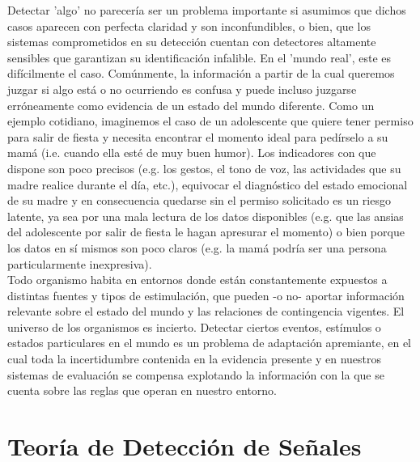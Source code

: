 Detectar 'algo' no parecería ser un problema importante si asumimos que dichos casos aparecen con perfecta claridad y son inconfundibles, o bien, que los sistemas comprometidos en su detección cuentan con detectores altamente sensibles que garantizan su identificación infalible. En el 'mundo real', este es difícilmente el caso. Comúnmente, la información a partir de la cual queremos juzgar si algo está o no ocurriendo es confusa y puede incluso juzgarse erróneamente como evidencia de un estado del mundo diferente. Como un ejemplo cotidiano, imaginemos el caso de un adolescente que quiere tener permiso para salir de fiesta y necesita encontrar el momento ideal para pedírselo a su mamá (i.e. cuando ella esté de muy buen humor). Los indicadores con que dispone son poco precisos (e.g. los gestos, el tono de voz, las actividades que su madre realice durante el día, etc.), equivocar el diagnóstico del estado emocional de su madre y en consecuencia quedarse sin el permiso solicitado es un riesgo latente, ya sea por una mala lectura de los datos disponibles (e.g. que las ansias del adolescente por salir de fiesta le hagan apresurar el momento) o bien porque los datos en sí mismos son poco claros (e.g. la mamá podría ser una persona particularmente inexpresiva).\\ 




Todo organismo habita en entornos donde están constantemente expuestos a distintas fuentes y tipos de estimulación, que pueden -o no- aportar información relevante sobre el estado del mundo y las relaciones de contingencia vigentes. El universo de los organismos es incierto. Detectar ciertos eventos, estímulos o estados particulares en el mundo es un problema de adaptación apremiante, en el cual toda la incertidumbre contenida en la evidencia presente y en nuestros sistemas de evaluación se compensa explotando la información con la que se cuenta sobre las reglas que operan en nuestro entorno.\\


\section{Teoría de Detección de Señales}


